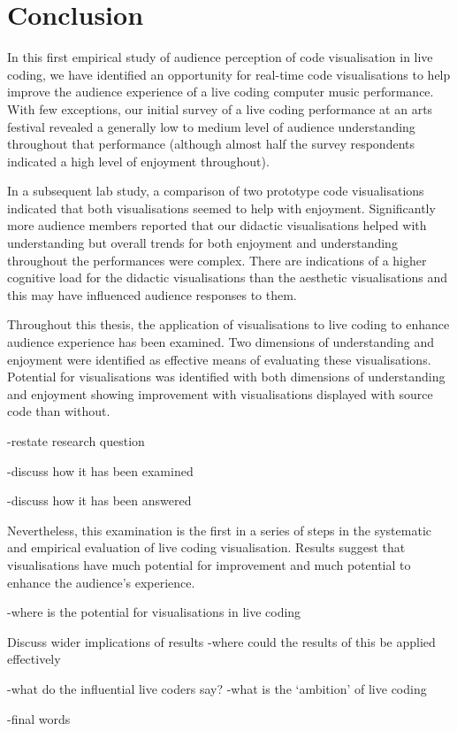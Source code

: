 
\chapter{Conclusion}
\label{chap:conclusion}

In this first empirical study of audience perception of code visualisation in live coding, we have identified an opportunity for real-time code visualisations to help improve the audience experience of a live coding computer music performance. With few exceptions, our initial survey of a live coding performance at an arts festival revealed a generally low to medium level of audience understanding throughout that performance (although almost half the survey respondents indicated a high level of enjoyment throughout).

In a subsequent lab study, a comparison of two prototype code visualisations indicated that both visualisations seemed to help with enjoyment. Significantly more audience members reported that our didactic visualisations helped with understanding but overall trends for both enjoyment and understanding throughout the performances were complex. There are indications of a higher cognitive load for the didactic visualisations than the aesthetic visualisations and this may have influenced audience responses to them.



Throughout this thesis, the application of visualisations to live coding to enhance audience experience has been examined. Two dimensions of understanding and enjoyment were identified as effective means of evaluating these visualisations. Potential for visualisations was identified with both dimensions of understanding and enjoyment showing improvement with visualisations displayed with source code than without.

-restate research question

-discuss how it has been examined

-discuss how it has been answered

Nevertheless, this examination is the first in a series of steps in the systematic and empirical evaluation of live coding visualisation. Results suggest that visualisations have much potential for improvement and much potential to enhance the audience's experience.

-where is the potential for visualisations in live coding

Discuss wider implications of results
-where could the results of this be applied effectively 

-what do the influential live coders say?
-what is the `ambition' of live coding

-final words
